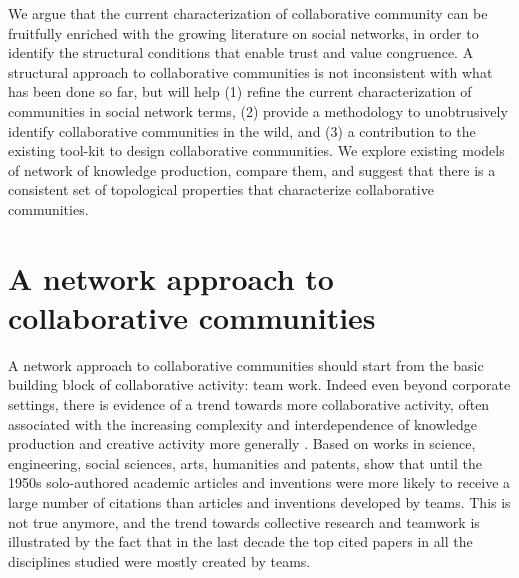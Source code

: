 We argue that the current characterization of collaborative community can be fruitfully enriched with the growing literature on social networks, in order to identify the structural conditions that enable trust and value congruence. A structural approach to collaborative communities is not inconsistent with what has been done so far, but will help (1) refine the current characterization of communities in social network terms, (2) provide a methodology to unobtrusively identify collaborative communities in the wild, and (3) a contribution to the existing tool-kit to design collaborative communities. We explore existing models of network of knowledge production, compare them, and suggest that there is a consistent set of topological properties that characterize collaborative communities.

\section{A network approach to collaborative communities}

A network approach to collaborative communities should start from the basic building block of collaborative activity: team work. Indeed even beyond corporate settings, there is evidence of a trend towards more collaborative activity, often associated with the increasing complexity and interdependence of knowledge production and creative activity more generally \citep*{guimera:2005,uzzi:2005,uzzi:2007a,jones:2008}. Based on works in science, engineering, social sciences, arts, humanities and patents, \citet{uzzi:2007a} show that until the 1950s solo-authored academic articles and inventions were more likely to receive a large number of citations than articles and inventions developed by teams.  This is not true anymore, and the trend towards collective research and teamwork is illustrated by the fact that in the last decade the top cited papers in all the disciplines studied were mostly created by teams.

